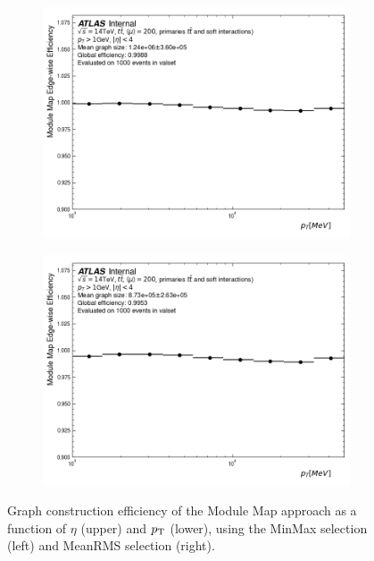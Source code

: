 \begin{figure}[h!]
\begin{subfigure}[b]{0.49\textwidth}
    \centering
    \includegraphics[width=\textwidth]{figures/gnn_MM_UNCLEANED_MINMAX_WITHOUT_CONCAT_LATENT128_LN/graph_construction_edgewise_efficiency_pt.png}
    \caption{}
    \label{subfig:mm-eff-minmax-pt}
\end{subfigure}
\begin{subfigure}[b]{0.49\textwidth}
    \centering
    \includegraphics[width=\textwidth]{figures/gnn_MM_UNCLEANED_MEANRMS_WITHOUT_CONCAT_LATENT128_LN/graph_construction_edgewise_efficiency_pt.png}
    \caption{}
    \label{subfig:mm-eff-meanrms-pt}
\end{subfigure}
    \caption{Graph construction efficiency of the Module Map approach as a function of $\eta$ (upper) and $p_{\text{T}}$ (lower), using the MinMax selection (left) and MeanRMS selection (right). }
    \label{fig:mm-eff}
\end{figure}

